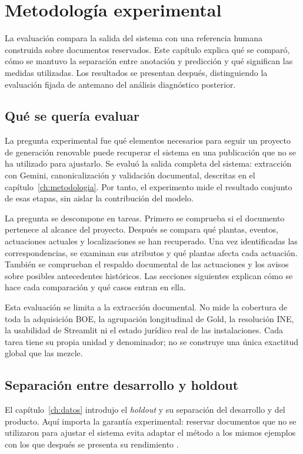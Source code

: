 \chapter{Metodología experimental}
\label{ch:evaluacion}
La evaluación compara la salida del sistema con una referencia humana
construida sobre documentos reservados. Este capítulo explica qué se comparó,
cómo se mantuvo la separación entre anotación y predicción y qué significan
las medidas utilizadas. Los resultados se presentan después, distinguiendo
la evaluación fijada de antemano del análisis diagnóstico posterior.

\section{Qué se quería evaluar}
La pregunta experimental fue qué elementos necesarios para seguir un proyecto
de generación renovable puede recuperar el sistema en una publicación que no
se ha utilizado para ajustarlo. Se evaluó la salida completa del sistema:
extracción con Gemini, canonicalización y validación documental, descritas en
el capítulo~\ref{ch:metodologia}. Por tanto, el experimento mide el resultado
conjunto de esas etapas, sin aislar la contribución del modelo.

La pregunta se descompone en tareas. Primero se comprueba si el documento
pertenece al alcance del proyecto. Después se compara qué plantas, eventos,
actuaciones actuales y localizaciones se han recuperado. Una vez identificadas
las correspondencias, se examinan sus atributos y qué plantas afecta cada
actuación. También se comprueban el respaldo documental de las actuaciones y
los avisos sobre posibles antecedentes históricos. Las secciones siguientes
explican cómo se hace cada comparación y qué casos entran en ella.

Esta evaluación se limita a la extracción documental. No mide la cobertura
de toda la adquisición BOE, la agrupación longitudinal de Gold, la resolución
INE, la usabilidad de Streamlit ni el estado jurídico real de las instalaciones.
Cada tarea tiene su propia unidad y denominador; no se construye una única
exactitud global que las mezcle.

\section{Separación entre desarrollo y holdout}
El capítulo~\ref{ch:datos} introdujo el \emph{holdout} y su separación del
desarrollo y del producto. Aquí importa la garantía experimental: reservar
documentos que no se utilizaron para ajustar el sistema evita adaptar el
método a los mismos ejemplos con los que después se presenta su rendimiento
\cite{hastie_elements_2009}.

